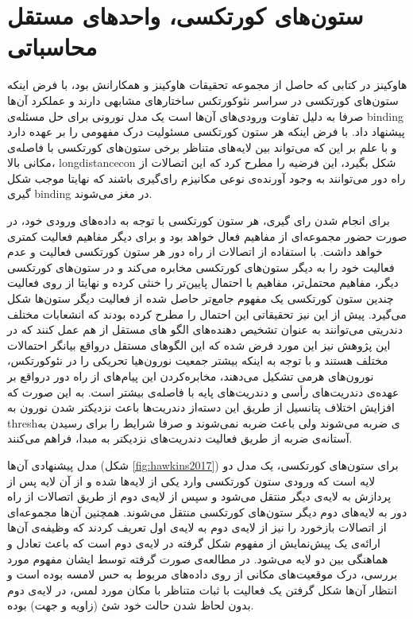 \documentclass[12pt]{report}
\begin{document}
	\section{ستون‌های کورتکسی، واحد‌های مستقل محاسباتی}
	هاوکینز در کتابی \cite{Hawkins2021-rq} که حاصل از مجموعه تحقیقات هاوکینز و همکارانش
	\cite{Hawkins2016, Hawkins2017, Lewis2019}
	بود، با فرض اینکه ستون‌های کورتکسی در سراسر نئوکورتکس ساختار‌های مشابهی دارند و عملکرد آن‌ها صرفا به دلیل تفاوت ورودی‌های آن‌ها است \cite{Mountcastle1978} یک مدل نورونی برای حل مسئله‌ی \gls{binding} پیشنهاد داد. با فرض اینکه هر ستون کورتکسی مسئولیت درک مفهومی را بر عهده دارد و با علم بر این که می‌تواند بین لایه‌های متناظر برخی ستون‌های کورتکسی با فاصله‌ی مکانی بالا، \gls{longdistancecon} شکل بگیرد، این فرضیه را مطرح کرد که این اتصالات از راه دور می‌توانند به وجود آورنده‌ی نوعی مکانیزم رای‌گیری باشند که نهایتا موجب شکل گیری \gls{binding} در مغز می‌شوند.
	
	برای انجام شدن رای گیری، هر ستون کورتکسی با توجه به داده‌های ورودی خود، در صورت حضور مجموعه‌ای از مفاهیم فعال خواهد بود و برای دیگر مفاهیم فعالیت کمتری خواهد داشت. با استفاده از اتصالات از راه دور هر ستون کورتکسی فعالیت و عدم فعالیت خود را به دیگر ستون‌های کورتکسی مخابره می‌کند و در ستون‌های کورتکسی دیگر، مفاهیم محتمل‌تر، مفاهیم با احتمال پایین‌تر را خنثی کرده و نهایتا از روی فعالیت چندین ستون کورتکسی یک مفهوم جامع‌تر حاصل شده از فعالیت دیگر ستون‌ها شکل می‌گیرد. پیش از این نیز تحقیقاتی این احتمال را مطرح کرده بودند که انشعابات مختلف دندریتی می‌توانند به عنوان تشخیص دهنده‌های الگو های مستقل از هم عمل کنند \cite{POIRAZI2003989, Polsky2004} که در این پژوهش نیز این مورد فرض شده که این الگو‌های مستقل درواقع بیانگر احتمالات مختلف هستند و با توجه به اینکه بیشتر جمعیت نورون‌هیا تحریکی را در نئوکورتکس، نورون‌های هرمی تشکیل می‌دهند، مخابره‌کردن این پیام‌های از راه دور درواقع بر عهده‌ی دندریت‌های رأسی و دندریت‌های پایه‌ با فاصله‌ی بیشتر است. به این صورت که افزایش اختلاف پتانسیل از طریق این دسته‌از دندریت‌ها باعث نزدیکتر شدن نورون به \gls{thresh}‌ی ضربه می‌شوند ولی باعث ضربه نمی‌شوند و صرفا شرایط را برای رسیدن به آستانه‌ی ضربه از طریق فعالیت دندریت‌های نزدیکتر به مبدا، فراهم می‌کنند.
	
	مدل پیشنهادی آن‌ها (شکل \ref{fig:hawkins2017}) برای ستون‌های کورتکسی، یک مدل دو لایه‌ است که ورودی ستون کورتکسی وارد یکی از لایه‌ها شده و از آن لایه پس از پردازش به لایه‌ی دیگر منتقل می‌شود و سپس از لایه‌‌ی دوم از طریق اتصالات از راه دور به لا‌‌یه‌های دوم دیگر ستون‌های کورتکسی منتقل می‌شوند. همچنین آن‌ها مجموعه‌ای از اتصالات بازخورد را نیز از لایه‌ی دوم به لا‌یه‌ی اول تعریف کردند که وظیفه‌ی آن‌ها ارائه‌ی یک پیش‌نمایش از مفهوم‌ شکل گرفته در لايه‌ی دوم است که باعث تعادل و هماهنگی بین دو لایه‌ می‌شود. در مطالعه‌ی صورت گرفته توسط ایشان\cite{Hawkins2017} مفهوم مورد بررسی، درک موقعیت‌های مکانی از روی داده‌های مربوط به حس لامسه بوده است و انتظار آن‌ها شکل گرفتن یک فعالیت با ثبات متناظر با مکان مورد لمس، در لایه‌ی دوم بدون لحاظ شدن حالت خود شئ (زاویه و جهت) بوده. 
	
\end{document}
